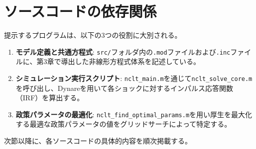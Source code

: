 \section*{ソースコードの依存関係}

提示するプログラムは、以下の3つの役割に大別される。
\begin{enumerate}
    \item \textbf{モデル定義と共通方程式}: \texttt{src/}フォルダ内の\texttt{.mod}ファイルおよび\texttt{.inc}ファイルに、第3章で導出した非線形方程式体系を記述している。
    \item \textbf{シミュレーション実行スクリプト}: \texttt{nclt\_main.m}を通じて\texttt{nclt\_solve\_core.m}を呼び出し、Dynareを用いて各ショックに対するインパルス応答関数（IRF）を算出する。
    \item \textbf{政策パラメータの最適化}: \texttt{nclt\_find\_optimal\_params.m}を用い厚生を最大化する最適な政策パラメータの値をグリッドサーチによって特定する。
\end{enumerate}

次節以降に、各ソースコードの具体的内容を順次掲載する。